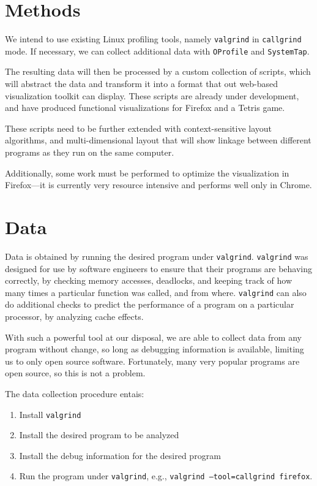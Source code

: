 \documentclass[12pt]{article}
\begin{document}
\section{Methods}
We intend to use existing Linux profiling tools, namely
\texttt{valgrind} in \texttt{callgrind} mode. If necessary, we can
collect additional data with \texttt{OProfile} and \texttt{SystemTap}.

The resulting data will then be processed by a custom collection of
scripts, which will abstract the data and transform it into a format
that out web-based visualization toolkit can display.  These scripts
are already under development, and have produced functional
visualizations for Firefox and a Tetris game.

These scripts need to be further extended with context-sensitive
layout algorithms, and multi-dimensional layout that will show linkage
between different programs as they run on the same computer.

Additionally, some work must be performed to optimize the
visualization in Firefox---it is currently very resource intensive and
performs well only in Chrome.

\section{Data}
Data is obtained by running the desired program under
\texttt{valgrind}. \texttt{valgrind} was designed for use by software
engineers to ensure that their programs are behaving correctly, by
checking memory accesses, deadlocks, and keeping track of how many
times a particular function was called, and from where.
\texttt{valgrind} can also do additional checks to predict the
performance of a program on a particular processor, by analyzing cache
effects.

With such a powerful tool at our disposal, we are able to collect data
from any program without change, so long as debugging information is
available, limiting us to only open source software.  Fortunately,
many very popular programs are open source, so this is not a problem.

The data collection procedure entais:
\begin{enumerate}
\item Install \texttt{valgrind}
\item Install the desired program to be analyzed
\item Install the debug information for the desired program
\item Run the program under \texttt{valgrind}, e.g., \texttt{valgrind
    --tool=callgrind firefox}.
\end{enumerate}
\end{document}
